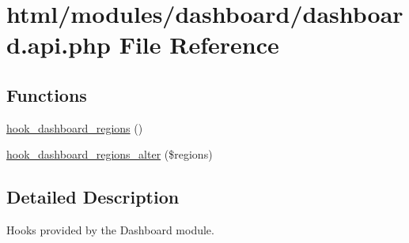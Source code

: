 \hypertarget{dashboard_8api_8php}{
\section{html/modules/dashboard/dashboard.api.php File Reference}
\label{dashboard_8api_8php}
}
\subsection*{Functions}
\begin{DoxyCompactItemize}
\item 
\hyperlink{group__hooks_ga533120daedea0c0bfd332400aab41ae2}{hook\_\-dashboard\_\-regions} ()
\item 
\hyperlink{group__hooks_gaf5148b413ca475e8d5246dad5357b918}{hook\_\-dashboard\_\-regions\_\-alter} (\$regions)
\end{DoxyCompactItemize}


\subsection{Detailed Description}
Hooks provided by the Dashboard module. 